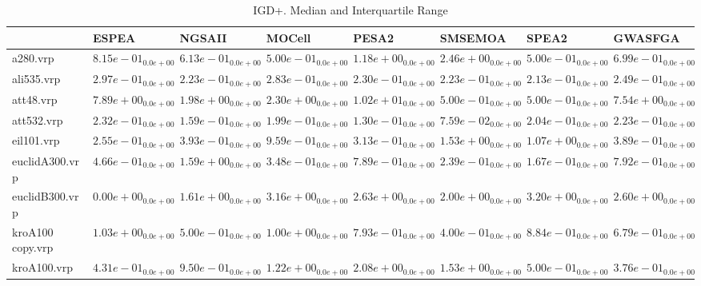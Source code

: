 \documentclass{article}
\begin{document}
\begin{table}
\caption{IGD+. Median and Interquartile Range}
\label{table: IGD+}
\centering
\begin{scriptsize}
\begin{tabular}{llllllll}
\hline & ESPEA & NGSAII & MOCell & PESA2 & SMSEMOA & SPEA2 &  GWASFGA\\
\hline 
a280.vrp & $  8.15e-01_{ 0.0e+00}$ & $  6.13e-01_{ 0.0e+00}$ & \cellcolor{gray95}$  5.00e-01_{ 0.0e+00}$ & $  1.18e+00_{ 0.0e+00}$ & $  2.46e+00_{ 0.0e+00}$ & \cellcolor{gray25}$  5.00e-01_{ 0.0e+00}$ & $  6.99e-01_{ 0.0e+00}$ \\
ali535.vrp & $  2.97e-01_{ 0.0e+00}$ & $  2.23e-01_{ 0.0e+00}$ & $  2.83e-01_{ 0.0e+00}$ & $  2.30e-01_{ 0.0e+00}$ & \cellcolor{gray25}$  2.23e-01_{ 0.0e+00}$ & \cellcolor{gray95}$  2.13e-01_{ 0.0e+00}$ & $  2.49e-01_{ 0.0e+00}$ \\
att48.vrp & $  7.89e+00_{ 0.0e+00}$ & $  1.98e+00_{ 0.0e+00}$ & $  2.30e+00_{ 0.0e+00}$ & $  1.02e+01_{ 0.0e+00}$ & \cellcolor{gray95}$  5.00e-01_{ 0.0e+00}$ & \cellcolor{gray25}$  5.00e-01_{ 0.0e+00}$ & $  7.54e+00_{ 0.0e+00}$ \\
att532.vrp & $  2.32e-01_{ 0.0e+00}$ & $  1.59e-01_{ 0.0e+00}$ & $  1.99e-01_{ 0.0e+00}$ & \cellcolor{gray25}$  1.30e-01_{ 0.0e+00}$ & \cellcolor{gray95}$  7.59e-02_{ 0.0e+00}$ & $  2.04e-01_{ 0.0e+00}$ & $  2.23e-01_{ 0.0e+00}$ \\
eil101.vrp & \cellcolor{gray95}$  2.55e-01_{ 0.0e+00}$ & $  3.93e-01_{ 0.0e+00}$ & $  9.59e-01_{ 0.0e+00}$ & \cellcolor{gray25}$  3.13e-01_{ 0.0e+00}$ & $  1.53e+00_{ 0.0e+00}$ & $  1.07e+00_{ 0.0e+00}$ & $  3.89e-01_{ 0.0e+00}$ \\
euclidA300.vrp & $  4.66e-01_{ 0.0e+00}$ & $  1.59e+00_{ 0.0e+00}$ & $  3.48e-01_{ 0.0e+00}$ & $  7.89e-01_{ 0.0e+00}$ & \cellcolor{gray25}$  2.39e-01_{ 0.0e+00}$ & \cellcolor{gray95}$  1.67e-01_{ 0.0e+00}$ & $  7.92e-01_{ 0.0e+00}$ \\
euclidB300.vrp & \cellcolor{gray95}$  0.00e+00_{ 0.0e+00}$ & \cellcolor{gray25}$  1.61e+00_{ 0.0e+00}$ & $  3.16e+00_{ 0.0e+00}$ & $  2.63e+00_{ 0.0e+00}$ & $  2.00e+00_{ 0.0e+00}$ & $  3.20e+00_{ 0.0e+00}$ & $  2.60e+00_{ 0.0e+00}$ \\
kroA100 copy.vrp & $  1.03e+00_{ 0.0e+00}$ & \cellcolor{gray25}$  5.00e-01_{ 0.0e+00}$ & $  1.00e+00_{ 0.0e+00}$ & $  7.93e-01_{ 0.0e+00}$ & \cellcolor{gray95}$  4.00e-01_{ 0.0e+00}$ & $  8.84e-01_{ 0.0e+00}$ & $  6.79e-01_{ 0.0e+00}$ \\
kroA100.vrp & \cellcolor{gray25}$  4.31e-01_{ 0.0e+00}$ & $  9.50e-01_{ 0.0e+00}$ & $  1.22e+00_{ 0.0e+00}$ & $  2.08e+00_{ 0.0e+00}$ & $  1.53e+00_{ 0.0e+00}$ & $  5.00e-01_{ 0.0e+00}$ & \cellcolor{gray95}$  3.76e-01_{ 0.0e+00}$ \\

\end{tabular}
\end{scriptsize}
\end{table}
\end{document}
